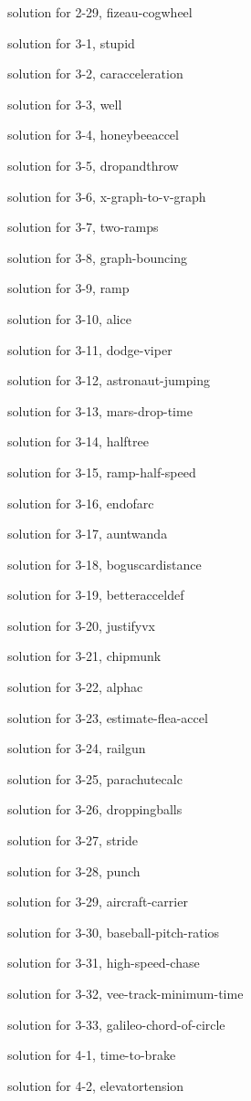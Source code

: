 \documentclass{problems}
\begin{document}
solution for 2-29, fizeau-cogwheel

solution for 3-1, stupid

solution for 3-2, caracceleration

solution for 3-3, well

solution for 3-4, honeybeeaccel

solution for 3-5, dropandthrow

solution for 3-6, x-graph-to-v-graph

solution for 3-7, two-ramps

solution for 3-8, graph-bouncing

solution for 3-9, ramp

solution for 3-10, alice

solution for 3-11, dodge-viper

solution for 3-12, astronaut-jumping

solution for 3-13, mars-drop-time

solution for 3-14, halftree

solution for 3-15, ramp-half-speed

solution for 3-16, endofarc

solution for 3-17, auntwanda

solution for 3-18, boguscardistance

solution for 3-19, betteracceldef

solution for 3-20, justifyvx

solution for 3-21, chipmunk

solution for 3-22, alphac

solution for 3-23, estimate-flea-accel

solution for 3-24, railgun

solution for 3-25, parachutecalc

solution for 3-26, droppingballs

solution for 3-27, stride

solution for 3-28, punch

solution for 3-29, aircraft-carrier

solution for 3-30, baseball-pitch-ratios

solution for 3-31, high-speed-chase

solution for 3-32, vee-track-minimum-time

solution for 3-33, galileo-chord-of-circle

solution for 4-1, time-to-brake

solution for 4-2, elevatortension
\end{document}
